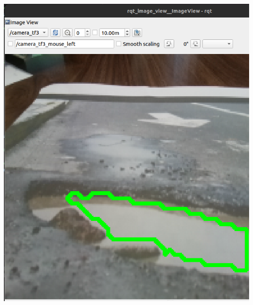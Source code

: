 \documentclass{beamer}
\begin{document}
\begin{frame}
\begin{columns}
\begin{column}{0.4\textwidth}
			\includegraphics[height=0.7\textwidth]{figs/contornobache2.png} \\[5pt]

		\end{column}
	\end{columns}
\end{frame}
\end{document}
